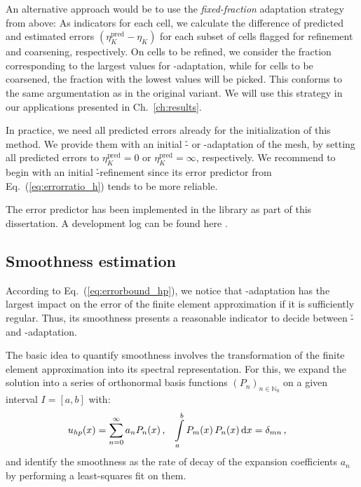 An alternative approach would be to use the \textit{fixed-fraction} adaptation strategy from above: As indicators for each cell, we calculate the difference of predicted and estimated errors $(\eta_K^\text{pred} - \eta_K)$ for each subset of cells flagged for refinement and coarsening, respectively. On cells to be refined, we consider the fraction corresponding to the largest values for \p-adaptation, while for cells to be coarsened, the fraction with the lowest values will be picked. This conforms to the same argumentation as in the original variant. We will use this strategy in our applications presented in Ch.~\ref{ch:results}.

In practice, we need all predicted errors already for the initialization of this method. We provide them with an initial \h- or \p-adaptation of the mesh, by setting all predicted errors to $\eta_K^\text{pred} = 0$ or $\eta_K^\text{pred} = \infty$, respectively. We recommend to begin with an initial \h-refinement since its error predictor from Eq.~(\ref{eq:errorratio_h}) tends to be more reliable.

The error predictor has been implemented in the \dealii{} library as part of this dissertation. A development log can be found here .



\subsection{Smoothness estimation}
\label{ssec:smoothness}

According to Eq.~(\ref{eq:errorbound_hp}), we notice that \p-adaptation has the largest impact on the error of the finite element approximation if it is sufficiently regular. Thus, its smoothness presents a reasonable indicator to decide between \h- and \p-adaptation.

The basic idea to quantify smoothness involves the transformation of the finite element approximation into its spectral representation. For this, we expand the solution into a series of orthonormal basis functions $(P_n)_{n\in\mathbb{N}_0}$ on a given interval $I = [a,b]$ with:
\begin{align}
u_{hp}(x) &= \sum\limits_{n=0}^\infty a_n P_n(x) \,\text{,} & \int\limits_a^b P_m(x) \, P_n(x) \mathop{}\!\mathrm{d}x &= \delta_{mn} \,\text{,}
\end{align}
and identify the smoothness as the rate of decay of the expansion coefficients $a_n$ by performing a least-squares fit on them.

